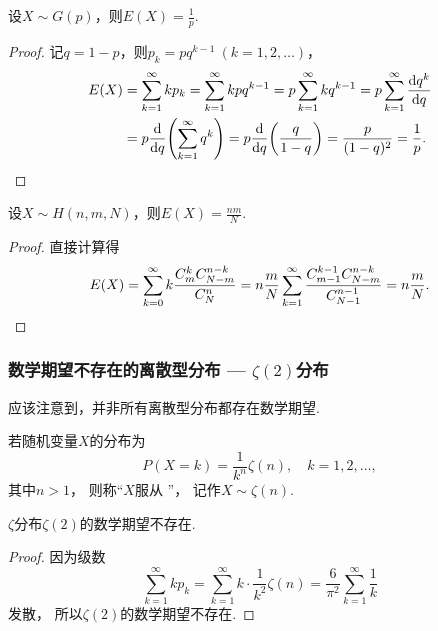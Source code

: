 \begin{proposition}\label{theorem:随机变量的数字特征.几何分布的数学期望}
设\(X \sim G(p)\)，则\(E(X) = \frac{1}{p}\).
\begin{proof}
记\(q = 1-p\)，则\(p_k = pq^{k-1}\ (k=1,2,\dotsc)\)，
\begin{align*}
	E(X)
	&= \sum_{k=1}^\infty k p_k
	= \sum_{k=1}^\infty k p q^{k-1}
	= p \sum_{k=1}^\infty k q^{k-1}
	= p \sum_{k=1}^\infty \dv{q^k}{q} \\
	&= p \dv{q}(\sum_{k=1}^\infty q^k)
	= p \dv{q}(\frac{q}{1-q})
	= \frac{p}{(1-q)^2}
	= \frac{1}{p}.
	\qedhere
\end{align*}
\end{proof}
\end{proposition}

\begin{proposition}\label{theorem:随机变量的数字特征.超几何分布的数学期望}
设\(X \sim H(n,m,N)\)，则\(E(X) = \frac{n m}{N}\).
\begin{proof}
直接计算得\begin{equation*}
	E(X)
	= \sum_{k=0}^\infty
		k \frac{C_m^k C_{N-m}^{n-k}}{C_N^n}
	= n \frac{m}{N}
		\sum_{k=1}^\infty
			\frac{C_{m-1}^{k-1} C_{N-m}^{n-k}}{C_{N-1}^{n-1}}
	= n \frac{m}{N}.
	\qedhere
\end{equation*}
\end{proof}
\end{proposition}

\subsubsection{数学期望不存在的离散型分布 --- \texorpdfstring{\(\zeta(2)\)}{\textzeta(2)}分布}
应该注意到，并非所有离散型分布都存在数学期望.

\begin{definition}
若随机变量\(X\)的分布为\begin{equation*}
	P(X=k) = \frac{1}{k^n} \zeta(n),
	\quad k=1,2,\dotsc,
\end{equation*}
其中\(n>1\)，
则称“\(X\)服从 ”，
记作\(X \sim \zeta(n)\).
\end{definition}

\begin{proposition}
\(\zeta\)分布\(\zeta(2)\)的数学期望不存在.
\begin{proof}
因为级数\begin{equation*}
	\sum_{k=1}^\infty k p_k
	= \sum_{k=1}^\infty k \cdot \frac{1}{k^2} \zeta(n)
	= \frac{6}{\pi^2} \sum_{k=1}^\infty \frac1k
\end{equation*}发散，
所以\(\zeta(2)\)的数学期望不存在.
\end{proof}
\end{proposition}

